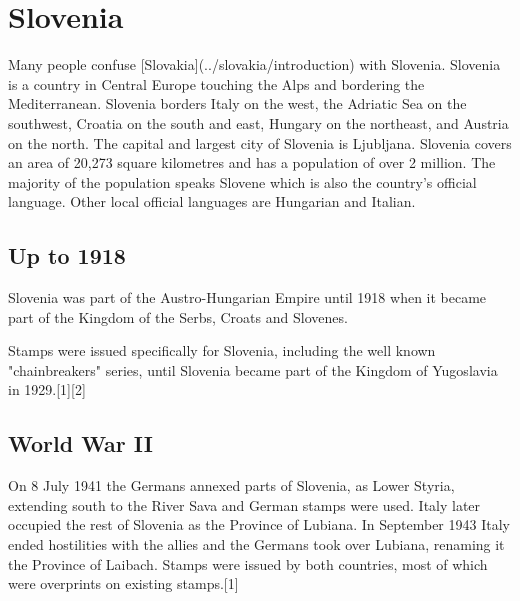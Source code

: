 \section{Slovenia}

Many people confuse [Slovakia](../slovakia/introduction) with Slovenia. 
Slovenia is a country in Central Europe touching the Alps and bordering the Mediterranean. Slovenia borders Italy on the west, the Adriatic Sea on the southwest, Croatia on the south and east, Hungary on the northeast, and Austria on the north. The capital and largest city of Slovenia is Ljubljana. Slovenia covers an area of 20,273 square kilometres and has a population of over 2 million. The majority of the population speaks Slovene which is also the country's official language. Other local official languages are Hungarian and Italian.

\subsection{Up to 1918}

Slovenia was part of the Austro-Hungarian Empire until 1918 when it became part of the Kingdom of the Serbs, Croats and Slovenes. 




Stamps were issued specifically for Slovenia, including the well known "chainbreakers" series, until Slovenia became part of the Kingdom of Yugoslavia in 1929.[1][2]




\subsection{World War II}

On 8 July 1941 the Germans annexed parts of Slovenia, as Lower Styria, extending south to the River Sava and German stamps were used. Italy later occupied the rest of Slovenia as the Province of Lubiana. In September 1943 Italy ended hostilities with the allies and the Germans took over Lubiana, renaming it the Province of Laibach. Stamps were issued by both countries, most of which were overprints on existing stamps.[1]


